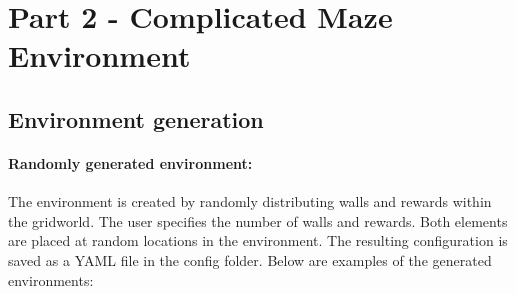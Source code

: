 \documentclass{article}
\begin{document}
\section{Part 2 - Complicated Maze Environment}

\subsection{Environment generation}

\paragraph{Randomly generated environment:} The environment is created by randomly distributing walls and rewards within the gridworld. The user specifies the number of walls and rewards. Both elements are placed at random locations in the environment. The resulting configuration is saved as a YAML file in the config folder. Below are examples of the generated environments:
\end{document}
